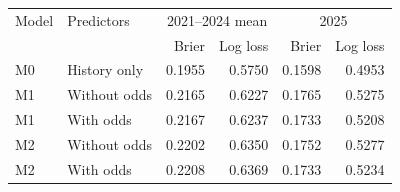 \begin{tabular}{llrrrr}
\toprule
Model & Predictors & \multicolumn{2}{c}{2021--2024 mean} & \multicolumn{2}{c}{2025} \\ 
 & & Brier & Log loss & Brier & Log loss \\
\midrule
M0 & History only & 0.1955 & 0.5750 & 0.1598 & 0.4953 \\
M1 & Without odds & 0.2165 & 0.6227 & 0.1765 & 0.5275 \\
M1 & With odds & 0.2167 & 0.6237 & 0.1733 & 0.5208 \\
M2 & Without odds & 0.2202 & 0.6350 & 0.1752 & 0.5277 \\
M2 & With odds & 0.2208 & 0.6369 & 0.1733 & 0.5234 \\
\bottomrule
\end{tabular}
